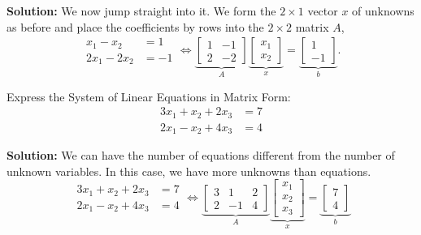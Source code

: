 \textbf{Solution:}
We now jump straight into it. We form the $2 \times 1$ vector $x$ of unknowns as before and place the coefficients by rows into the $2 \times 2$ matrix $A$,
\begin{equation}
\label{eq:Axeqb03}
\begin{aligned}
x_1-x_2 &=1 \\
2x_1-2x_2&=-1
\end{aligned} \iff \underbrace{\left[\begin{array}{rr} 1 & -1\\
2 & -2 \end{array}\right]}_{A} \underbrace{\left[\begin{array}{c} x_1\\
x_2\end{array}\right]}_{x} =   \underbrace{\left[\begin{array}{r} 1\\
-1\end{array}\right]}_{b}.
\end{equation}
\Qed

\begin{example}
\label{ex:ExpressMatrixForm02BB}
Express the System of Linear Equations in Matrix Form: 
\begin{equation}
\begin{aligned}
3x_1+x_2+2x_3 &=7 \\
2x_1-x_2+4x_3&=4
\end{aligned}
\end{equation}
\end{example}

\textbf{Solution:} We can have the number of equations different from the number of unknown variables. In this case, we have more unknowns than equations. 
\begin{equation}
\label{eq:Axeqb04D}
\begin{aligned}
3x_1+x_2+2x_3 &=7 \\
2x_1-x_2+4x_3&=4
\end{aligned}
\iff \underbrace{\left[\begin{array}{rrr} 3 & 1 & 2\\
2 & -1 & 4\end{array}\right]}_{A} \underbrace{\left[\begin{array}{c} x_1\\ x_2 \\ x_3\end{array}\right]}_{x} =   \underbrace{\left[\begin{array}{c} 7\\ 4 \end{array}\right]}_{b}
\end{equation}
\Qed


